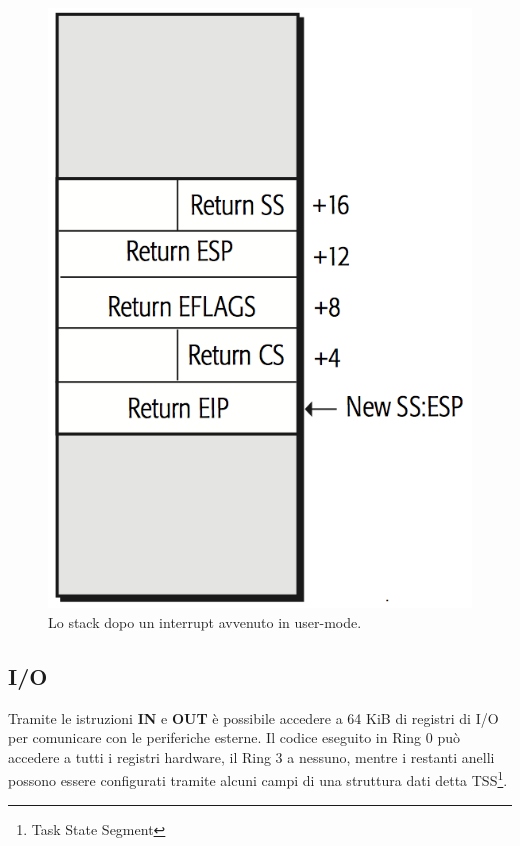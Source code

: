 \documentclass[12pt,a4paper]{report}
\begin{document}
			\begin{figure}[htbp]
			\centering
			\includegraphics[scale=0.7]{img/interrupt.png}
			\caption{Lo stack dopo un interrupt avvenuto in user-mode. \cite{AMD}\label{fig:interrupt}}
			\end{figure}
			
		\subsection{I/O}
			Tramite le istruzioni \textbf{IN} e \textbf{OUT} è possibile accedere a 64 KiB di registri di I/O per comunicare con le periferiche esterne.
			Il codice eseguito in Ring 0 può accedere a tutti i registri hardware, il Ring 3 a nessuno, mentre i restanti anelli possono
			essere configurati tramite alcuni campi di una struttura dati detta TSS\footnote{Task State Segment}.
			
\end{document}
